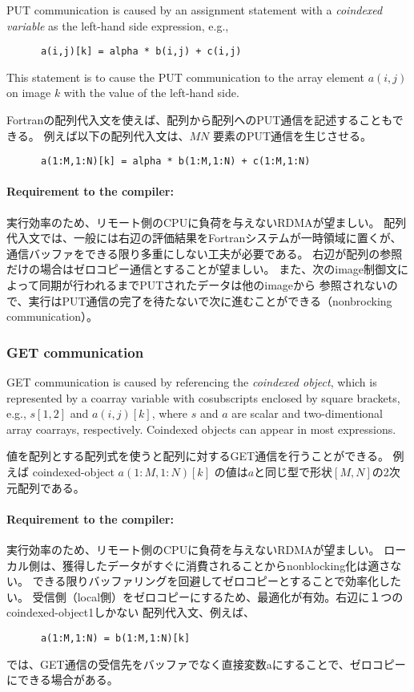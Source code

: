 PUT communication is caused by an assignment statement with a {\em coindexed variable} 
as the left-hand side expression, e.g.,
\begin{verbatim}
      a(i,j)[k] = alpha * b(i,j) + c(i,j)
\end{verbatim}
This statement is to cause the PUT communication to the array element $a(i,j)$ on image $k$
with the value of the left-hand side.

Fortranの配列代入文を使えば、配列から配列へのPUT通信を記述することもできる。
例えば以下の配列代入文は、$M N$ 要素のPUT通信を生じさせる。
\begin{verbatim}
      a(1:M,1:N)[k] = alpha * b(1:M,1:N) + c(1:M,1:N)
\end{verbatim}

\paragraph{Requirement to the compiler:}
実行効率のため、リモート側のCPUに負荷を与えないRDMAが望ましい。
配列代入文では、一般には右辺の評価結果をFortranシステムが一時領域に置くが、
通信バッファをできる限り多重にしない工夫が必要である。
右辺が配列の参照だけの場合はゼロコピー通信とすることが望ましい。
また、次のimage制御文によって同期が行われるまでPUTされたデータは他のimageから
参照されないので、実行はPUT通信の完了を待たないで次に進むことができる（nonbrocking communication）。


\subsubsection{GET communication}

GET communication is caused by referencing the {\em coindexed object}, 
which is represented by a coarray variable with cosubscripts enclosed by square brackets, 
e.g., $s[1,2]$ and $a(i,j)[k]$, where $s$ and $a$ are scalar and two-dimentional array coarrays,
respectively.
Coindexed objects can appear in most expressions.

値を配列とする配列式を使うと配列に対するGET通信を行うことができる。
例えば coindexed-object $a(1:M,1:N)[k]$ の値は$a$と同じ型で形状$[M, N]$の2次元配列である。


\paragraph{Requirement to the compiler:}
実行効率のため、リモート側のCPUに負荷を与えないRDMAが望ましい。
ローカル側は、獲得したデータがすぐに消費されることからnonblocking化は適さない。
できる限りバッファリングを回避してゼロコピーとすることで効率化したい。
受信側（local側）をゼロコピーにするため、最適化が有効。右辺に１つのcoindexed-object1しかない
配列代入文、例えば、
\begin{verbatim}
      a(1:M,1:N) = b(1:M,1:N)[k]
\end{verbatim}
では、GET通信の受信先をバッファでなく直接変数aにすることで、ゼロコピーにできる場合がある。



